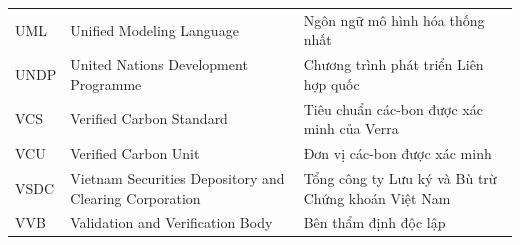 \documentclass[a4paper,oneside]{report}
\begin{document}
\begin{longtable}{@{}p{2.4cm}p{5.4cm}p{6.3cm}@{}}
UML    & Unified Modeling Language                 & Ngôn ngữ mô hình hóa thống nhất \\
UNDP   & United Nations Development Programme      & Chương trình phát triển Liên hợp quốc \\
VCS    & Verified Carbon Standard                  & Tiêu chuẩn các-bon được xác minh của Verra \\
VCU    & Verified Carbon Unit                      & Đơn vị các-bon được xác minh \\
VSDC   & Vietnam Securities Depository and Clearing Corporation & Tổng công ty Lưu ký và Bù trừ Chứng khoán Việt Nam \\
VVB    & Validation and Verification Body          & Bên thẩm định độc lập \\
\end{longtable}

\end{document}
